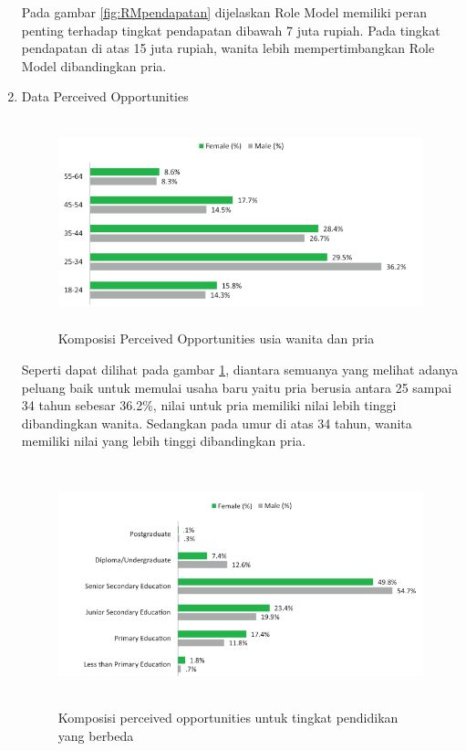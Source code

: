 \begin{enumerate}
Pada gambar \ref{fig:RMpendapatan} dijelaskan Role Model memiliki peran penting terhadap tingkat pendapatan dibawah 7 juta rupiah. Pada tingkat pendapatan di atas 15 juta rupiah, wanita lebih mempertimbangkan Role Model dibandingkan pria.
	\item Data Perceived Opportunities
\begin{figure} [H]
	\centering  
	\includegraphics[width=12cm, height=6cm]{umurPO2013} 
	\caption[Komposisi Perceived Opportunities usia wanita dan pria]{Komposisi Perceived Opportunities usia wanita dan pria} 
	\label{fig:POUmur} 
\end{figure} 

Seperti dapat dilihat pada gambar \ref{fig:POUmur}, diantara semuanya yang melihat adanya peluang baik untuk memulai usaha baru yaitu pria berusia antara 25 sampai 34 tahun sebesar 36.2\%, nilai untuk pria memiliki nilai lebih tinggi dibandingkan wanita. Sedangkan pada umur di atas 34 tahun, wanita memiliki nilai yang lebih tinggi dibandingkan pria.

\begin{figure} [H]
	\centering  
	\includegraphics[width=14cm, height=7cm]{pendidikanPO2013} 
	\caption[Komposisi perceived opportunities untuk tingkat pendidikan yang berbeda]{Komposisi perceived opportunities untuk tingkat pendidikan yang berbeda} 
	\label{fig:POpendidikan} 
\end{figure}  


\end{enumerate}
